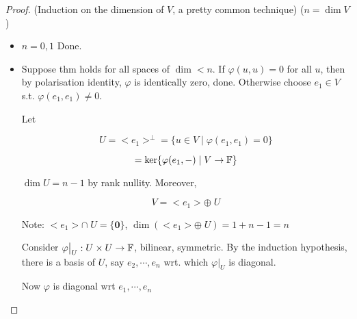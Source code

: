\documentclass[a4paper]{article}
\begin{document}
\begin{proof}
	(Induction on the dimension of $ V $, a pretty common technique) ($ n = \dim V $)
	
	\begin{itemize}
		\item $ n = 0,1 $ Done.
		\item Suppose thm holds for all spaces of $ \dim < n $. If $ \varphi(u,u) = 0 $ for all $ u $, then by polarisation identity, $ \varphi $ is identically zero, done.
		Otherwise choose $ e_{1} \in V  $ s.t. $ \varphi(e_{1},e_{1}) \neq 0 $.
		
		Let 
		
	\[ U = < e_{1} >^{\perp} = \{  u \in V \; | \; \varphi(e_{1},e_{1}) = 0 \} \]
	
	\[ = \ker\{ \varphi(e_{1},-) \; | \; V \to \mathbb{F}  \} \]
	
	
	$ \dim U = n - 1$ by rank nullity. Moreover,
	
	\[ V = <e_{1}> \oplus \; U \]
	
	
	Note: $ <e_{1}>   \cap \; U = \{  \mathbf{0} \} $, $ \dim (  <e_{1}>  \oplus \; U ) = 1 + n - 1 = n$
	
	
	Consider $ \varphi \big|_{U} : U \times U \to \mathbb{F}  $, bilinear, symmetric. By the induction hypothesis, there is a basis of $ U $, say $ e_{2},\cdots,e_{n} $ wrt. which $ \varphi \big|_{U} $ is diagonal.
	
	Now $ \varphi $ is diagonal wrt $ e_{1},\cdots,e_{n} $
	
	\end{itemize}                                                   
\end{proof}     
\end{document}
